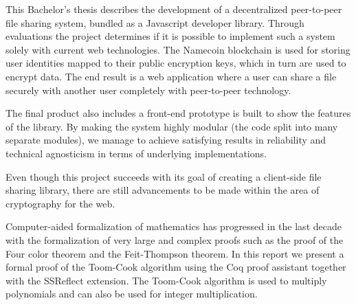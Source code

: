 %

This Bachelor's thesis describes the development of a decentralized peer-to-peer file sharing system, bundled as a Javascript developer library. Through evaluations the project determines if it is possible to implement such a system solely with current web technologies. The Namecoin blockchain is used for storing user identities mapped to their public encryption keys, which in turn are used to encrypt data. The end result is a web application where a user can share a file securely with another user completely with peer-to-peer technology.

The final product also includes a front-end prototype is built to show the features of the library. By making the system highly modular (the code split into many separate modules), we manage to achieve satisfying results in reliability and technical agnosticism in terms of underlying implementations.

Even though this project succeeds with its goal of creating a client-side file sharing library, there are still advancements to be made within the area of cryptography for the web.

Computer-aided formalization of mathematics has progressed in the last decade with the formalization of very large and complex proofs such as the proof of the Four color theorem and the Feit-Thompson theorem. In this report we present a formal proof of the Toom-Cook algorithm using the Coq proof assistant together with the SSReflect extension. The Toom-Cook algorithm is used to multiply polynomials and can also be used for integer multiplication.
